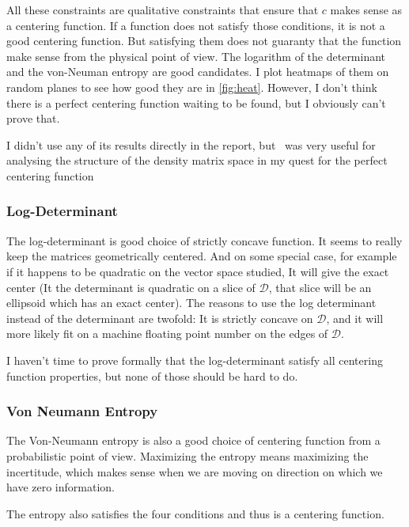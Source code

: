 \documentclass[10pt,a4paper]{report}
\theoremstyle{plain}
\theoremstyle{definition}
\theoremstyle{remark}
\begin{document}
All these constraints are qualitative constraints that ensure that $c$ makes sense
as a centering function. If a function does not satisfy those conditions, it is
not a good centering function. But satisfying them does not guaranty that the function
make sense from the physical point of view. The logarithm of the determinant and
the von-Neuman entropy are good candidates. I plot heatmaps of them on random
planes to see how good they are in \cref{fig:heat}. However, I don't think
there is a perfect centering function waiting to be found, but I obviously can't
prove that.

I didn't use any of its results directly in the report, but~\cite{Bhatia07} was
very useful for analysing the structure of the density matrix space in my quest
for the perfect centering function

\subsubsection{Log-Determinant}

The log-determinant is good choice of strictly concave function. It seems to
really keep the matrices geometrically centered. And on some special case, for
example if it happens to be quadratic on the vector space studied, It will give
the exact center (It the determinant is quadratic on a slice of $\mathcal{D}$,
that slice will be an ellipsoid which has an exact center). The reasons to use
the log determinant instead of the determinant are twofold: It is strictly
concave on $\mathcal{D}$, and it will more likely fit on a machine floating
point number on the edges of $\mathcal{D}$.

I haven't time to prove formally that the log-determinant satisfy all centering
function properties, but none of those should be hard to do.
\subsubsection{Von Neumann Entropy}

The Von-Neumann entropy is also a good choice of centering function from a probabilistic
point of view. Maximizing the entropy means maximizing the incertitude, which
makes sense when we are moving on direction on which we have zero information.

The entropy also satisfies the four conditions and thus is a centering function.
\end{document}
